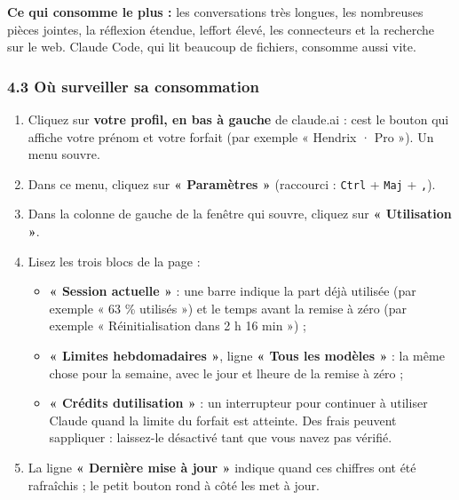 \documentclass[
  french,
  11pt,
  a4paper,
]{article}
\providecommand{\tightlist}{%
  \setlength{\itemsep}{0pt}\setlength{\parskip}{0pt}}
\begin{document}
\textbf{Ce qui consomme le plus :} les conversations très longues, les
nombreuses pièces jointes, la réflexion étendue,
l\textquotesingle effort élevé, les connecteurs et la recherche sur le
web. Claude Code, qui lit beaucoup de fichiers, consomme aussi vite.

\subsubsection{4.3 Où surveiller sa
consommation}\label{43-ouxf9-surveiller-sa-consommation}

\begin{enumerate}
\def\labelenumi{\arabic{enumi}.}
\tightlist
\item
  Cliquez sur \textbf{votre profil, en bas à gauche} de claude.ai :
  c\textquotesingle est le bouton qui affiche votre prénom et votre
  forfait (par exemple « Hendrix · Pro »). Un menu
  s\textquotesingle ouvre.
\item
  Dans ce menu, cliquez sur \textbf{« Paramètres »} (raccourci :
  \texttt{Ctrl} + \texttt{Maj} + \texttt{,}).
\item
  Dans la colonne de gauche de la fenêtre qui s\textquotesingle ouvre,
  cliquez sur \textbf{« Utilisation »}.
\item
  Lisez les trois blocs de la page :

  \begin{itemize}
  \tightlist
  \item
    \textbf{« Session actuelle »} : une barre indique la part déjà
    utilisée (par exemple « 63 \% utilisés ») et le temps avant la
    remise à zéro (par exemple « Réinitialisation dans 2 h 16 min ») ;
  \item
    \textbf{« Limites hebdomadaires »}, ligne \textbf{« Tous les modèles
    »} : la même chose pour la semaine, avec le jour et
    l\textquotesingle heure de la remise à zéro ;
  \item
    \textbf{« Crédits d\textquotesingle utilisation »} : un interrupteur
    pour continuer à utiliser Claude quand la limite du forfait est
    atteinte. Des frais peuvent s\textquotesingle appliquer : laissez-le
    désactivé tant que vous n\textquotesingle avez pas vérifié.
  \end{itemize}
\item
  La ligne \textbf{« Dernière mise à jour »} indique quand ces chiffres
  ont été rafraîchis ; le petit bouton rond à côté les met à jour.
\end{enumerate}
\end{document}
